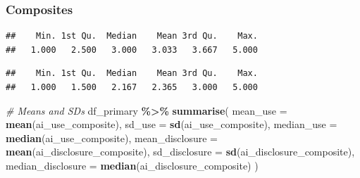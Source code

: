 \documentclass[
]{article}
\newenvironment{Shaded}{\begin{snugshade}}{\end{snugshade}}
\newcommand{\AttributeTok}[1]{\textcolor[rgb]{0.13,0.29,0.53}{#1}}
\newcommand{\CommentTok}[1]{\textcolor[rgb]{0.56,0.35,0.01}{\textit{#1}}}
\newcommand{\ConstantTok}[1]{\textcolor[rgb]{0.56,0.35,0.01}{#1}}
\newcommand{\FunctionTok}[1]{\textcolor[rgb]{0.13,0.29,0.53}{\textbf{#1}}}
\newcommand{\NormalTok}[1]{#1}
\newcommand{\OtherTok}[1]{\textcolor[rgb]{0.56,0.35,0.01}{#1}}
\newcommand{\SpecialCharTok}[1]{\textcolor[rgb]{0.81,0.36,0.00}{\textbf{#1}}}
\begin{document}
\subsubsection{Composites}\label{composites}

\begin{Shaded}
\end{Shaded}

\begin{verbatim}
##    Min. 1st Qu.  Median    Mean 3rd Qu.    Max. 
##   1.000   2.500   3.000   3.033   3.667   5.000
\end{verbatim}

\begin{Shaded}
\end{Shaded}

\begin{verbatim}
##    Min. 1st Qu.  Median    Mean 3rd Qu.    Max. 
##   1.000   1.500   2.167   2.365   3.000   5.000
\end{verbatim}

\begin{Shaded}
\begin{Highlighting}[]
\CommentTok{\# Means and SDs}
\NormalTok{df\_primary }\SpecialCharTok{\%\textgreater{}\%}
  \FunctionTok{summarise}\NormalTok{(}
    \AttributeTok{mean\_use          =} \FunctionTok{mean}\NormalTok{(ai\_use\_composite),}
    \AttributeTok{sd\_use            =} \FunctionTok{sd}\NormalTok{(ai\_use\_composite),}
    \AttributeTok{median\_use        =} \FunctionTok{median}\NormalTok{(ai\_use\_composite),}
    \AttributeTok{mean\_disclosure   =} \FunctionTok{mean}\NormalTok{(ai\_disclosure\_composite),}
    \AttributeTok{sd\_disclosure     =} \FunctionTok{sd}\NormalTok{(ai\_disclosure\_composite),}
    \AttributeTok{median\_disclosure =} \FunctionTok{median}\NormalTok{(ai\_disclosure\_composite)}
\NormalTok{  )}
\end{Highlighting}
\end{Shaded}
\end{document}

